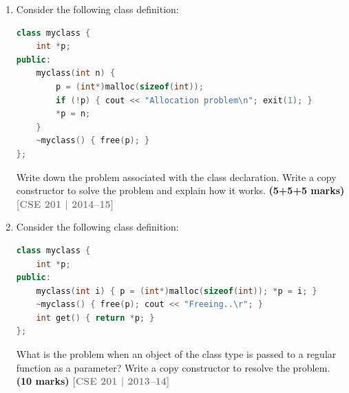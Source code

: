 \documentclass[12pt,a3paper]{article}
\newcommand{\yr}[1]{\hfill\textcolor{gray}{\small\textbf{[#1]}}}
\newcommand{\mk}[1]{\textcolor{orange!70!black}{\small\textbf{(#1 marks)}}}
\begin{document}
\begin{enumerate}
\begin{tcolorbox}[enhanced,breakable,ansbox,colback=cE!4,colframe=cE,
  boxrule=0.8pt,arc=5pt,
  title={\textbf{Answer --- Output of Animal process() code}},
  fonttitle=\bfseries\color{white},colbacktitle=cE]

\textbf{Output (verified by compiler):}
\begin{lstlisting}
First line
Constructing
Second line
Third line
In process
Constructing
Destructing
Return line
Destructing
Destructing
Destructing
\end{lstlisting}

\textbf{Trace:} \texttt{a} constructed; \texttt{b=a} (compiler copy,
no print); \texttt{process(b)} --- param copy (no print), then local
\texttt{b} constructed (\texttt{Constructing}), local \texttt{b} and
param destroyed on return (\texttt{Destructing} twice); finally
\texttt{c}, \texttt{b}, \texttt{a} destroyed at end of main.

\end{tcolorbox}

\item Consider the following class definition:
\begin{lstlisting}[language=C++]
class myclass {
    int *p;
public:
    myclass(int n) {
        p = (int*)malloc(sizeof(int));
        if (!p) { cout << "Allocation problem\n"; exit(1); }
        *p = n;
    }
    ~myclass() { free(p); }
};
\end{lstlisting}
Write down the problem associated with the class declaration. Write a copy constructor to solve the problem and explain how it works. \mk{5+5+5}
\yr{CSE 201 | 2014--15}


\item Consider the following class definition:
\begin{lstlisting}[language=C++]
class myclass {
    int *p;
public:
    myclass(int i) { p = (int*)malloc(sizeof(int)); *p = i; }
    ~myclass() { free(p); cout << "Freeing..\r"; }
    int get() { return *p; }
};
\end{lstlisting}
What is the problem when an object of the class type is passed to a regular function as a parameter? Write a copy constructor to resolve the problem. \mk{10}
\yr{CSE 201 | 2013--14}

\begin{tcolorbox}[enhanced,breakable,ansbox,colback=cE!4,colframe=cE,
  boxrule=0.8pt,arc=5pt,
  title={\textbf{Answer --- S5-Q3 \& Q4: myclass shallow copy problem and copy constructor fix}},
  fonttitle=\bfseries\color{white},colbacktitle=cE]


\end{tcolorbox}
\end{enumerate}
\end{document}
